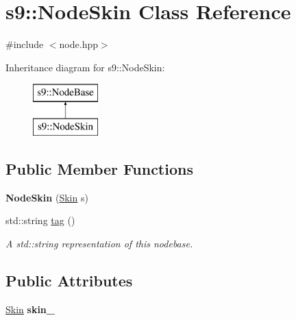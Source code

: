 \hypertarget{classs9_1_1NodeSkin}{\section{s9\-:\-:Node\-Skin Class Reference}
\label{classs9_1_1NodeSkin}
}


{\ttfamily \#include $<$node.\-hpp$>$}

Inheritance diagram for s9\-:\-:Node\-Skin\-:\begin{figure}[H]
\begin{center}
\leavevmode
\includegraphics[height=2.000000cm]{classs9_1_1NodeSkin}
\end{center}
\end{figure}
\subsection*{Public Member Functions}
\begin{DoxyCompactItemize}
\item 
\hypertarget{classs9_1_1NodeSkin_a9a1697224907a5ed0c862f452d020e21}{{\bfseries Node\-Skin} (\hyperlink{classs9_1_1Skin}{Skin} s)}\label{classs9_1_1NodeSkin_a9a1697224907a5ed0c862f452d020e21}

\item 
\hypertarget{classs9_1_1NodeSkin_a7489f4cf6aa77e56f7208b7f297e87b8}{std\-::string \hyperlink{classs9_1_1NodeSkin_a7489f4cf6aa77e56f7208b7f297e87b8}{tag} ()}\label{classs9_1_1NodeSkin_a7489f4cf6aa77e56f7208b7f297e87b8}

\begin{DoxyCompactList}\small\item\em A std\-::string representation of this nodebase. \end{DoxyCompactList}\end{DoxyCompactItemize}
\subsection*{Public Attributes}
\begin{DoxyCompactItemize}
\item 
\hypertarget{classs9_1_1NodeSkin_ade3cca5556e266f8270d62fd6f111d5d}{\hyperlink{classs9_1_1Skin}{Skin} {\bfseries skin\-\_\-}}\label{classs9_1_1NodeSkin_ade3cca5556e266f8270d62fd6f111d5d}

\end{DoxyCompactItemize}
